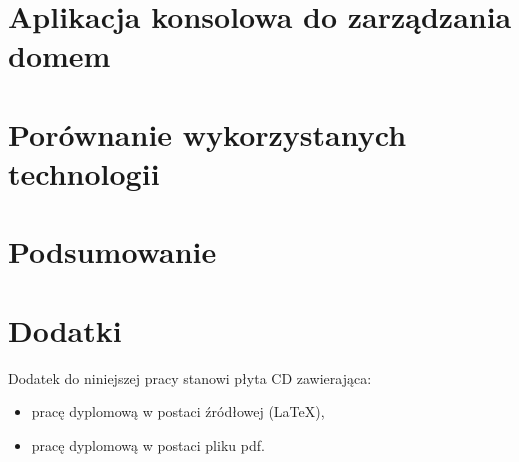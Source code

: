 \documentclass[11pt, a4paper,polish,twoside]{report}
\numberwithin{equation}{section}
\begin{document}
\chapter{Aplikacja konsolowa do zarządzania domem} \label{aplikacja_zarzadzanie}


\chapter{Porównanie wykorzystanych technologii}



\chapter{Podsumowanie}



%

\nocite{*}
\printbibliography 

\chapter*{Dodatki}
Dodatek do niniejszej pracy stanowi płyta CD zawierająca:
\begin{itemize}
\item pracę dyplomową w postaci źródłowej (LaTeX),
\item pracę dyplomową w postaci pliku pdf.
\end{itemize}

\newpage
{}	
\listoffigures

\newpage
{}	
\listoftables

\newpage
{}	


\end{document}
